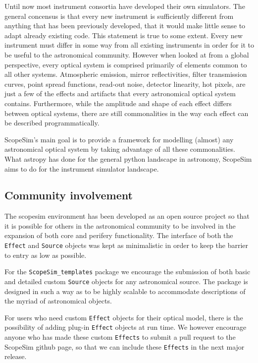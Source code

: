 Until now most instrument consortia have developed their own simulators.
The general concensus is that every new instrument is sufficiently different from anything that has been previously developed, that it would make little sense to adapt already existing code.
This statement is true to some extent.
Every new instrument must differ in some way from all existing instruments in order for it to be useful to the astronomical community.
However when looked at from a global perspective, every optical system is comprised primarily of elements common to all other systems.
Atmospheric emission, mirror reflectivities, filter transmission curves, point spread functions, read-out noise, detector linearity, hot pixels, are just a few of the effects and artifacts that every astronomical optical system contains.
Furthermore, while the amplitude and shape of each effect differs between optical systems, there are still commonalities in the way each effect can be described programmatically.

ScopeSim's main goal is to provide a framework for modelling (almost) any astronomical optical system by taking advantage of all these commonalities.
What astropy has done for the general python landscape in astronomy, ScopeSim aims to do for the instrument simulator landscape.


\subsection{Community involvement%
  \label{community-involvement}%
}

The scopesim environment has been developed as an open source project so that it is possible for others in the astronomical community to be involved in the expansion of both core and perifery functionality.
The interface of both the \texttt{Effect} and \texttt{Source} objects was kept as minimalistic in order to keep the barrier to entry as low as possible.

For the \texttt{ScopeSim\_templates} package we encourage the submission of both basic and detailed custom \texttt{Source} objects for any astronomical source.
The package is designed in such a way as to be highly scalable to accommodate descriptions of the myriad of astronomical objects.

For users who need custom \texttt{Effect} objects for their optical model, there is the possibility of adding \textquotedbl{}plug-in\textquotedbl{} \texttt{Effect} objects at run time.
We however encourage anyone who has made these custom \texttt{Effects} to submit a pull request to the ScopeSim github page, so that we can include these \texttt{Effects} in the next major release.



